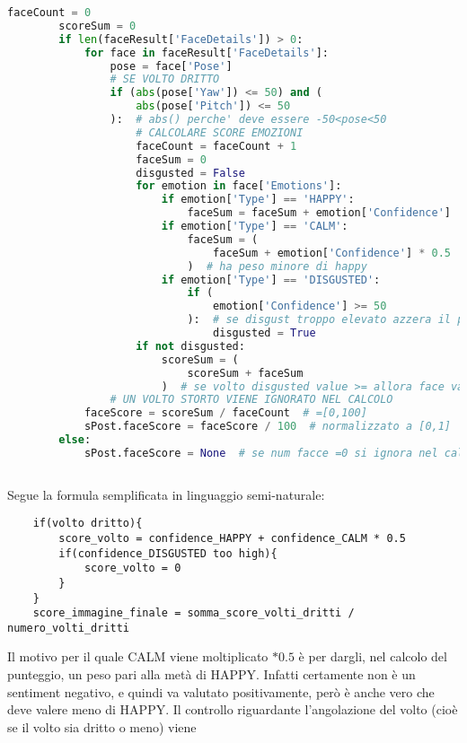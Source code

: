 \begin{lstlisting}[language=Python]
    faceCount = 0
        scoreSum = 0
        if len(faceResult['FaceDetails']) > 0:
            for face in faceResult['FaceDetails']:
                pose = face['Pose']
                # SE VOLTO DRITTO
                if (abs(pose['Yaw']) <= 50) and (
                    abs(pose['Pitch']) <= 50
                ):  # abs() perche' deve essere -50<pose<50
                    # CALCOLARE SCORE EMOZIONI
                    faceCount = faceCount + 1
                    faceSum = 0
                    disgusted = False
                    for emotion in face['Emotions']:
                        if emotion['Type'] == 'HAPPY':
                            faceSum = faceSum + emotion['Confidence']
                        if emotion['Type'] == 'CALM':
                            faceSum = (
                                faceSum + emotion['Confidence'] * 0.5
                            )  # ha peso minore di happy
                        if emotion['Type'] == 'DISGUSTED':
                            if (
                                emotion['Confidence'] >= 50
                            ):  # se disgust troppo elevato azzera il punteggio della faccia
                                disgusted = True
                    if not disgusted:
                        scoreSum = (
                            scoreSum + faceSum
                        )  # se volto disgusted value >= allora face value = 0
                # UN VOLTO STORTO VIENE IGNORATO NEL CALCOLO
            faceScore = scoreSum / faceCount  # =[0,100]
            sPost.faceScore = faceScore / 100  # normalizzato a [0,1]
        else:
            sPost.faceScore = None  # se num facce =0 si ignora nel calcolo di final Score
            
\end{lstlisting}
Segue la formula semplificata in linguaggio semi-naturale:
\begin{lstlisting}
    if(volto dritto){
        score_volto = confidence_HAPPY + confidence_CALM * 0.5 
        if(confidence_DISGUSTED too high){
            score_volto = 0
        }
    }
    score_immagine_finale = somma_score_volti_dritti / numero_volti_dritti
\end{lstlisting}
Il motivo per il quale CALM viene moltiplicato $*0.5$ è per dargli, nel calcolo del punteggio, un
peso pari alla metà di HAPPY. Infatti certamente non è un sentiment negativo, e quindi va
valutato positivamente, però è anche vero che deve valere meno di HAPPY.
Il controllo riguardante l'angolazione del volto (cioè se il volto sia dritto o meno) viene
